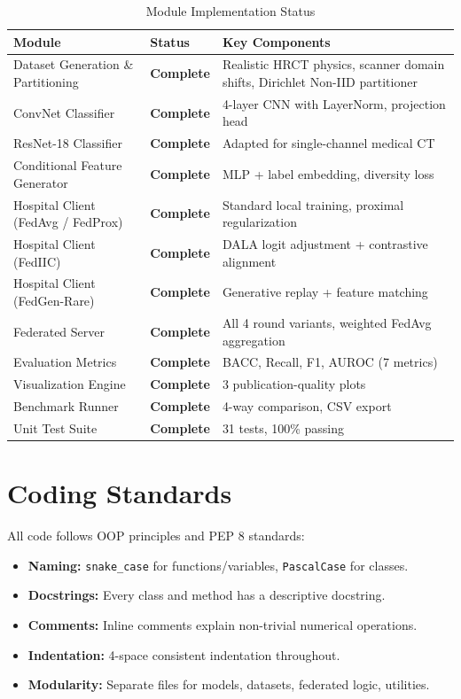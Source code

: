 \documentclass[12pt,a4paper]{report}
\begin{document}
\begin{table}[H]
    \centering
    \caption{Module Implementation Status}
    \label{tab:impl_status}
    \begin{tabular}{|p{5cm}|p{3cm}|p{6cm}|}
        \hline
        \textbf{Module} & \textbf{Status} & \textbf{Key Components} \\
        \hline
        Dataset Generation \& Partitioning & \textbf{Complete} & Realistic HRCT physics, scanner domain shifts, Dirichlet Non-IID partitioner \\
        \hline
        ConvNet Classifier & \textbf{Complete} & 4-layer CNN with LayerNorm, projection head \\
        \hline
        ResNet-18 Classifier & \textbf{Complete} & Adapted for single-channel medical CT \\
        \hline
        Conditional Feature Generator & \textbf{Complete} & MLP + label embedding, diversity loss \\
        \hline
        Hospital Client (FedAvg / FedProx) & \textbf{Complete} & Standard local training, proximal regularization \\
        \hline
        Hospital Client (FedIIC) & \textbf{Complete} & DALA logit adjustment + contrastive alignment \\
        \hline
        Hospital Client (FedGen-Rare) & \textbf{Complete} & Generative replay + feature matching \\
        \hline
        Federated Server & \textbf{Complete} & All 4 round variants, weighted FedAvg aggregation \\
        \hline
        Evaluation Metrics & \textbf{Complete} & BACC, Recall, F1, AUROC (7 metrics) \\
        \hline
        Visualization Engine & \textbf{Complete} & 3 publication-quality plots \\
        \hline
        Benchmark Runner & \textbf{Complete} & 4-way comparison, CSV export \\
        \hline
        Unit Test Suite & \textbf{Complete} & 31 tests, 100\% passing \\
        \hline
    \end{tabular}
\end{table}

\section{Coding Standards}
All code follows OOP principles and PEP 8 standards:
\begin{itemize}
    \item \textbf{Naming:} \texttt{snake\_case} for functions/variables, \texttt{PascalCase} for classes.
    \item \textbf{Docstrings:} Every class and method has a descriptive docstring.
    \item \textbf{Comments:} Inline comments explain non-trivial numerical operations.
    \item \textbf{Indentation:} 4-space consistent indentation throughout.
    \item \textbf{Modularity:} Separate files for models, datasets, federated logic, utilities.
\end{itemize}
\end{document}
